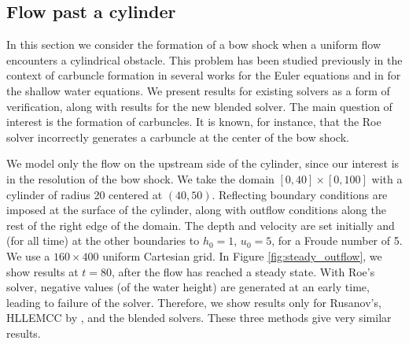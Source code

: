\documentclass[preprint, 11pt]{article}
\begin{document}


\subsection{Flow past a cylinder}\label{sec:bow_shock}
In this section we consider the formation of a bow shock when a
uniform flow encounters a cylindrical obstacle.  This problem has
been studied previously in the context of carbuncle formation in
several works for the Euler equations and in
\cite{kemm2014note,bader2014carbuncle} for the shallow water equations.
We present results for existing solvers as a form of verification,
along with results for the new blended solver.  The main question of
interest is the formation of carbuncles.  It is known, for instance,
that the Roe solver incorrectly generates a carbuncle at the center
of the bow shock.

We model only the flow on the upstream side of the cylinder, since
our interest is in the resolution of the bow shock.  We take the domain
$[0,40]\times[0,100]$ with a cylinder of radius 20 centered at $(40,50)$.
Reflecting boundary conditions are imposed at the surface of the cylinder,
along with outflow conditions along the rest of the right edge of the domain.
The depth and velocity are set initially and (for all time) at the other
boundaries to $h_0=1$, $u_0=5$, for a Froude number of 5.  We use a $160 \times 400$
uniform Cartesian grid.
%
In Figure \ref{fig:steady_outflow}, we show results at $t=80$, after the flow has reached
a steady state.  With Roe's solver, negative values (of the water height) are generated at an early
time, leading to failure of the solver.  Therefore, we show results only for
Rusanov's, HLLEMCC by \cite{kemm2014note}, and the blended solvers.  These three methods give very similar
results.
\end{document}
